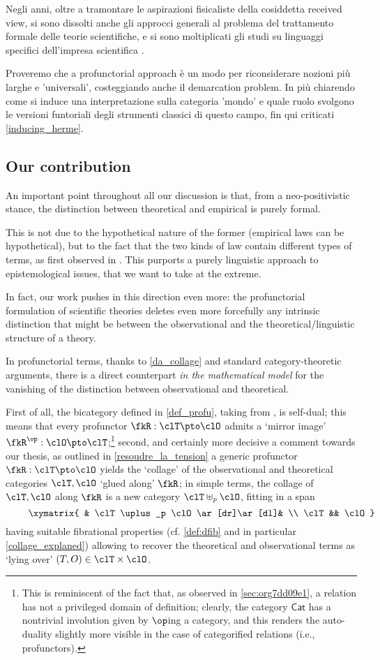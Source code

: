 Negli anni, oltre a tramontare le aspirazioni fisicaliste della cosiddetta received view, si sono dissolti anche gli approcci generali al problema del trattamento formale delle teorie scientifiche, e si sono moltiplicati gli studi su linguaggi specifici dell'impresa scientifica \cite{}.

Proveremo che a profunctorial approach è un modo per riconsiderare nozioni più larghe e 'universali', costeggiando anche il demarcation problem. In più chiarendo come si induce una interpretazione sulla categoria 'mondo' e quale ruolo svolgono le versioni funtoriali degli strumenti classici di questo campo, fin qui criticati \autoref{inducing_herme}.

\subsection{Our contribution}
An important point throughout all our discussion is that, from a neo-positivistic stance, the distinction between theoretical and empirical is purely formal.

This is not due to the hypothetical nature of the former (empirical laws can be hypothetical), but to the fact that the two kinds of law contain different types of terms, as first observed in \cite{carnap56}. This purports a purely linguistic approach to epistemological issues, that we want to take at the extreme.

In fact, our work pushes in this direction even more: the profunctorial formulation of scientific theories deletes even more forcefully any intrinsic distinction that might be between the observational and the theoretical\fshyp{}linguistic structure of a theory.

In profunctorial terms, thanks to \autoref{da_collage} and standard category\hyp{}theoretic arguments, there is a direct counterpart \emph{in the mathematical model} for the vanishing of the distinction between observational and theoretical.

First of all, the bicategory defined in \autoref{def_profu}, taking from \cite{benabou2000distributors}, is self-dual; this means that every profunctor $\fkR : \clT \pto \clO$ admits a `mirror image' $\fkR^\op : \clO \pto \clT$;\footnote{This is reminiscent of the fact that, as observed in \autoref{sec:org7dd09e1}, a relation has not a privileged domain of definition; clearly, the category $\mathsf{Cat}$ has a nontrivial involution given by $\op$ing a category, and this renders the auto-duality slightly more visible in the case of categorified relations (i.e., profunctors).} second, and certainly more decisive a comment towards our thesis, as outlined in \autoref{resoudre_la_tension} a generic profunctor $\fkR : \clT \pto\clO$ yields the `collage' of the observational and theoretical categories $\clT,\clO$ `glued along' $\fkR$; in simple terms, the collage of $\clT,\clO$ along $\fkR$ is a new category $\clT\uplus_p\clO$, fitting in a span
\[ \vcenter{\xymatrix{
			& \clT\uplus_p \clO \ar[dr]\ar[dl]& \\
			\clT  && \clO
		}} \] having suitable fibrational properties (cf. \autoref{def:dfib} and in particular \autoref{collage_explaned}) allowing to recover the theoretical and observational terms as `lying over' $(T,O)\in\clT\times\clO$.

